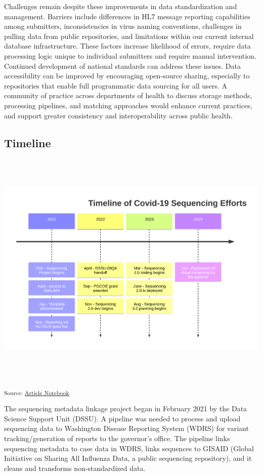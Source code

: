 \documentclass[
  letterpaper,
  DIV=11,
  numbers=noendperiod]{scrartcl}
\begin{document}
Challenges remain despite these improvements in data standardization and
management. Barriers include differences in HL7 message reporting
capabilities among submitters, inconsistencies in virus naming
conventions, challenges in pulling data from public repositories, and
limitations within our current internal database infrastructure. These
factors increase likelihood of errors, require data processing logic
unique to individual submitters and require manual intervention.
Continued development of national standards can address these issues.
Data accessibility can be improved by encouraging open-source sharing,
especially to repositories that enable full programmatic data sourcing
for all users. A community of practice across departments of health to
discuss storage methods, processing pipelines, and matching approaches
would enhance current practices, and support greater consistency and
interoperability across public health.

\subsection{Timeline}\label{timeline}

\includegraphics[width=7in,height=4.47in]{index_files/figure-latex/mermaid-figure-13.png}

\textsubscript{Source:
\href{https://NW-PaGe.github.io/sequencing_integration_pipeline1.0/index.qmd.html}{Article
Notebook}}

The sequencing metadata linkage project began in February 2021 by the
Data Science Support Unit (DSSU). A pipeline was needed to process and
upload sequencing data to Washington Disease Reporting System (WDRS) for
variant tracking/generation of reports to the governor's
office\hspace{0pt}. The pipeline links sequencing metadata to case data
in WDRS, links sequences to GISAID (Global Initiative on Sharing All
Influenza Data, a public sequencing repository), and it cleans and
transforms non-standardized data.
\end{document}
